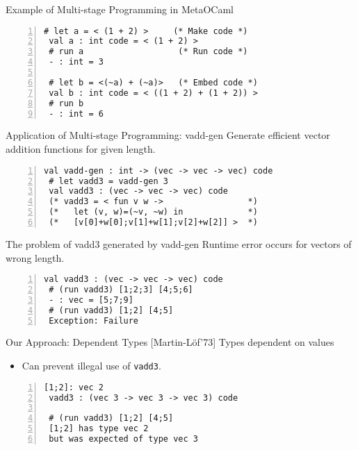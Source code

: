 \documentclass[dvipdfmx,aspectratio=169, 20pt]{beamer}
\renewcommand{\V}{\vdash}
\begin{document}
\begin{frame}[fragile]{Example of Multi-stage Programming in MetaOCaml}
    \begin{exampleblock}{}
        \begin{Verbatim}[numbers=left]
 # let a = < (1 + 2) >     (* Make code *)
 val a : int code = < (1 + 2) >
 # run a                   (* Run code *)
 - : int = 3

 # let b = <(~a) + (~a)>   (* Embed code *)
 val b : int code = < ((1 + 2) + (1 + 2)) >
 # run b
 - : int = 6
        \end{Verbatim}
    \end{exampleblock}
    \note{
    }
\end{frame}

\begin{frame}[fragile]{Application of Multi-stage Programming: vadd-gen}
    Generate efficient vector addition functions for given length.
    \begin{exampleblock}{}
    \begin{Verbatim}[numbers=left]
 val vadd-gen : int -> (vec -> vec -> vec) code
 # let vadd3 = vadd-gen 3
 val vadd3 : (vec -> vec -> vec) code
 (* vadd3 = < fun v w ->                 *)
 (*   let (v, w)=(~v, ~w) in             *)
 (*   [v[0]+w[0];v[1]+w[1];v[2]+w[2]] >  *)
    \end{Verbatim}
    \end{exampleblock}
    \note{
    }
\end{frame}

\begin{frame}[fragile]{The problem of vadd3 generated by vadd-gen}
    Runtime error occurs for vectors of wrong length.
    \begin{exampleblock}{}
    \begin{Verbatim}[numbers=left]
 val vadd3 : (vec -> vec -> vec) code
 # (run vadd3) [1;2;3] [4;5;6]
 - : vec = [5;7;9]
 # (run vadd3) [1;2] [4;5]
 Exception: Failure
    \end{Verbatim}
    \end{exampleblock}
    \note{
    }
\end{frame}

\begin{frame}[fragile]{Our Approach: Dependent Types [Martin-L{\"o}f'73]}
    \renewcommand{\V}{\text{vec}\ }
    Types dependent on values
    \begin{itemize}
        \item Can prevent illegal use of {\verb|vadd3|}.
    \end{itemize}
    \begin{exampleblock}{}
 \begin{Verbatim}[numbers=left]
 [1;2]: vec 2
 vadd3 : (vec 3 -> vec 3 -> vec 3) code

 # (run vadd3) [1;2] [4;5]
 [1;2] has type vec 2
 but was expected of type vec 3
 \end{Verbatim}
    \end{exampleblock}
\end{frame}
\end{document}
